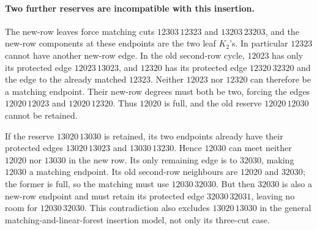 \paragraph{Two further reserves are incompatible with this insertion.}
The new-row leaves force matching cuts $12303\,12323$ and
$13203\,23203$, and the new-row components at these endpoints are the
two leaf $K_2$'s. In particular $12323$ cannot have another new-row edge.
In the old second-row cycle, $12023$ has only its protected edge
$12023\,13023$, and $12320$ has its protected edge $12320\,32320$
and the edge to the already matched $12323$.
Neither $12023$ nor $12320$ can therefore be a matching endpoint.
Their new-row degrees must both be two, forcing the edges
$12020\,12023$ and $12020\,12320$. Thus $12020$ is full, and the old
reserve $12020\,12030$ cannot be retained.

If the reserve $13020\,13030$ is retained, its two endpoints already
have their protected edges $13020\,13023$ and $13030\,13230$.
Hence $12030$ can meet neither $12020$ nor $13030$ in the new row.
Its only remaining edge is to $32030$, making $12030$ a matching
endpoint. Its old second-row neighbours are $12020$ and $32030$;
the former is full, so the matching must use $12030\,32030$.
But then $32030$ is also a new-row endpoint and must retain its
protected edge $32030\,32031$, leaving no room for $12030\,32030$.
This contradiction also excludes $13020\,13030$ in the general
matching-and-linear-forest insertion model, not only its three-cut case.
